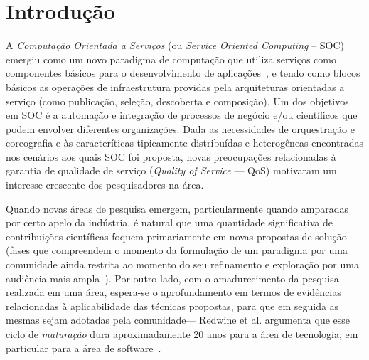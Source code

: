 
\section{Introdu\c{c}\~{a}o}\label{sec:introduction}

A \emph{Computa\c c\~{a}o Orientada a Servi\c cos} (ou \emph{Service Oriented Computing} -- SOC) emergiu como 
um novo paradigma de computa\c c\~{a}o que utiliza servi\c cos como componentes b\'{a}sicos para o desenvolvimento 
de aplica\c c\~{o}es~\cite{papazoglou:cacm2003}, e tendo como blocos b\'{a}sicos as opera\c c\~{o}es de infraestrutura providas 
pela arquiteturas orientadas a servi\c co (como publica\c c\~{a}o, sele\c c\~{a}o, descoberta e composi\c c\~{a}o).  
Um dos objetivos em SOC \'{e} a automa\c c\~{a}o e integra\c c\~{a}o de processos de neg\'{o}cio e/ou cient\'{i}ficos que podem envolver 
diferentes organiza\c c\~{o}es. Dada as necessidades de orquestra\c c\~{a}o e coreografia e \`{a}s  caracter\'{i}ticas tipicamente distribu\'{i}das e heterog\^{e}neas encontradas 
nos cen\'{a}rios aos quais SOC foi proposta, novas preocupa\c c\~{o}es relacionadas \`{a} garantia de qualidade de 
servi\c co (\emph{Quality of Service} --- QoS) motivaram um interesse crescente dos 
pesquisadores na \'{a}rea. 

Quando novas \'{a}reas de pesquisa emergem, particularmente quando amparadas por 
certo apelo da ind\'{u}stria, \'{e} natural que uma quantidade significativa de 
contribui\c c\~{o}es cient\'{i}ficas foquem primariamente em novas propostas de solu\c c\~{a}o 
(fases que compreendem o momento da formula\c c\~{a}o de um paradigma por uma comunidade ainda restrita 
ao momento do seu refinamento e explora\c c\~{a}o por uma audi\^{e}ncia mais ampla~\cite{redwine:icse1985}).   
Por outro lado, com o amadurecimento da pesquisa realizada em uma \'{a}rea, espera-se o aprofundamento 
em termos de evid\^{e}ncias relacionadas \`{a} aplicabilidade das t\'{e}cnicas propostas, para que em seguida as mesmas sejam adotadas pela comunidade--- Redwine et al. argumenta que 
esse ciclo de \emph{matura\c c\~{a}o} dura aproximadamente 20 anos para a \'{a}rea de tecnologia, em 
particular para a \'{a}rea de software~\cite{redwine:icse1985}.


